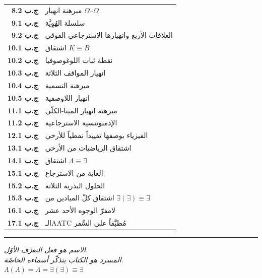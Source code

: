 \documentclass[10pt, openany, oneside]{book}
\begin{document}
{\begin{tabular}{r p{}}
\textbf{ج.ب 8.2} & مبرهنة انهيار $\Omega$--$\Omega$ \\[0.2em]
\textbf{ج.ب 9.1} & سلسلة الهُوِيَّة \\[0.2em]
\textbf{ج.ب 9.2} & العلاقات الأربع وانهيارها الاسترجاعي الفوقي \\[0.2em]
\textbf{ج.ب 10.1} & اشتقاق $K \equiv B$ \\[0.2em]
\textbf{ج.ب 10.2} & نقطة ثبات اللوغوصوفيا \\[0.2em]
\textbf{ج.ب 10.3} & انهيار المواقف الثلاثة \\[0.2em]
\textbf{ج.ب 10.4} & مبرهنة التسمية \\[0.2em]
\textbf{ج.ب 10.5} & انهيار اللاوصفية \\[0.2em]
\textbf{ج.ب 11.1} & مبرهنة انهيار الميتا-الكلّي \\[0.2em]
\textbf{ج.ب 11.2} & الإدمبوتنسية الاسترجاعية \\[0.2em]
\textbf{ج.ب 12.1} & الفيزياء بوصفها تقييداً نمطياً للأرخي \\[0.2em]
\textbf{ج.ب 13.1} & اشتقاق الرياضيات من الأرخي \\[0.2em]
\textbf{ج.ب 14.1} & اشتقاق $\Lambda \equiv \exists$ \\[0.2em]
\textbf{ج.ب 15.1} & الغاية من الاسترجاع \\[0.2em]
\textbf{ج.ب 15.2} & الحلول البذرية الثلاثة \\[0.2em]
\textbf{ج.ب 15.3} & اشتقاق كلّ الميادين من $\exists(\exists) \equiv \exists$ \\[0.2em]
\textbf{ج.ب 16.1} & لامفرّ الوجوه الأحد عشر \\[0.2em]
\textbf{ج.ب 17.1} & الـAATC مُطبَّقاً على السِّفر \\[0.2em]
\end{tabular}
}

\vspace{2em}

\begin{center}
    \rule{0.15\textwidth}{0.3pt}
\end{center}

\vspace{0.5em}

\begin{center}
    \itshape
    الاسم هو فعل التعرّف الأوّل.\\
    المسرد هو الكتاب يتذكّر أسماءه الخاصّة.\\[0.8em]
    $\Lambda(\Lambda) = \Lambda = \exists(\exists) \equiv \exists$
\end{center}
\end{document}
